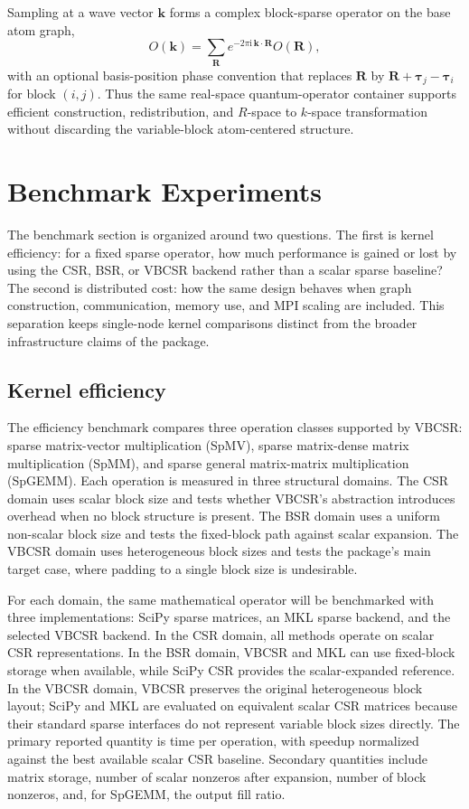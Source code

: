 \documentclass[
reprint,
superscriptaddress,
frontmatterverbose,
amsmath,amssymb,
pra,
]{revtex4-2}
\newcommand{\ii}{{\mathrm{i}}}
\renewcommand\boldsymbol{\bm}
\begin{document}
Sampling at a wave vector $\mathbf{k}$ forms a complex block-sparse operator on
the base atom graph,
\begin{equation}
    O(\mathbf{k}) =
    \sum_{\mathbf{R}} e^{-2\pi\ii\,\mathbf{k}\cdot\mathbf{R}}
    O(\mathbf{R}),
    \label{eq:k_sampling}
\end{equation}
with an optional basis-position phase convention that replaces
$\mathbf{R}$ by $\mathbf{R}+\boldsymbol{\tau}_j-\boldsymbol{\tau}_i$ for block
$(i,j)$.  Thus the same real-space quantum-operator container supports
efficient construction, redistribution, and $R$-space to $k$-space
transformation without discarding the variable-block atom-centered structure.

\section{Benchmark Experiments}

The benchmark section is organized around two questions.  The first is kernel
efficiency: for a fixed sparse operator, how much performance is gained or lost
by using the CSR, BSR, or VBCSR backend rather than a scalar sparse baseline?
The second is distributed cost: how the same design behaves when graph
construction, communication, memory use, and MPI scaling are included.  This
separation keeps single-node kernel comparisons distinct from the broader
infrastructure claims of the package.

\subsection{Kernel efficiency}

The efficiency benchmark compares three operation classes supported by VBCSR:
sparse matrix-vector multiplication (SpMV), sparse matrix-dense matrix
multiplication (SpMM), and sparse general matrix-matrix multiplication
(SpGEMM).  Each operation is measured in three structural domains.  The CSR
domain uses scalar block size and tests whether VBCSR's abstraction introduces
overhead when no block structure is present.  The BSR domain uses a uniform
non-scalar block size and tests the fixed-block path against scalar expansion.
The VBCSR domain uses heterogeneous block sizes and tests the package's main
target case, where padding to a single block size is undesirable.

For each domain, the same mathematical operator will be benchmarked with three
implementations: SciPy sparse matrices, an MKL sparse backend, and the selected
VBCSR backend.  In the CSR domain, all methods operate on scalar CSR
representations.  In the BSR domain, VBCSR and MKL can use fixed-block storage
when available, while SciPy CSR provides the scalar-expanded reference.  In the
VBCSR domain, VBCSR preserves the original heterogeneous block layout; SciPy
and MKL are evaluated on equivalent scalar CSR matrices because their standard
sparse interfaces do not represent variable block sizes directly.  The primary
reported quantity is time per operation, with speedup normalized against the
best available scalar CSR baseline.  Secondary quantities include matrix
storage, number of scalar nonzeros after expansion, number of block nonzeros,
and, for SpGEMM, the output fill ratio.
\end{document}
